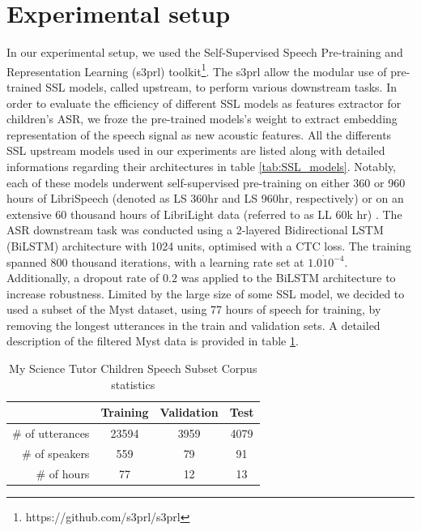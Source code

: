 \section{Experimental setup}
In our experimental setup, we used the Self-Supervised Speech Pre-training and Representation Learning (s3prl) toolkit\footnote{https://github.com/s3prl/s3prl}. The s3prl allow the modular use of pre-trained \ac{SSL} models, called upstream, to perform various downstream tasks. In order to evaluate the efficiency of different \ac{SSL} models as features extractor for children's \ac{ASR}, we froze the pre-trained models's weight to extract embedding representation of the speech signal as new acoustic features. All the differents \ac{SSL} upstream models used in our experiments are listed along with detailed informations regarding their architectures in table \ref{tab:SSL_models}. Notably, each of these models underwent self-supervised pre-training on either 360 or 960 hours of LibriSpeech \cite{librispeech} (denoted as LS 360hr and LS 960hr, respectively) or on an extensive 60 thousand hours of LibriLight data \cite{librilight} (referred to as LL 60k hr) . 
The \ac{ASR} downstream task was conducted using a 2-layered Bidirectional \ac{LSTM} (BiLSTM) architecture with 1024 units, optimised with a \ac{CTC} loss. The training spanned 800 thousand iterations, with a learning rate set at $1.0\dot 10^{-4}$. Additionally, a dropout rate of $0.2$ was applied to the BiLSTM architecture to increase robustness. Limited by the large size of some \ac{SSL} model, we decided to used a subset of the Myst \cite{MyST} dataset, using 77 hours of speech for training, by removing the longest utterances in the train and validation sets. A detailed description of the filtered Myst data is provided in table \ref{tab:SSL_myst}.
\begin{table}[h!]

    
    \begin{center}
    \begin{tabular}{r|ccc}
    \hline
     & Training & Validation     & Test   \\ \hline
    \# of utterances & 23594   & 3959    & 4079  \\ 
    \# of speakers & 559  & 79    & 91  \\ 
    \# of hours & 77   & 12    & 13  \\ \hline
    \end{tabular}
    \caption{My Science Tutor Children Speech Subset Corpus statistics}
    \label{tab:SSL_myst}
    \end{center}
    \end{table}


